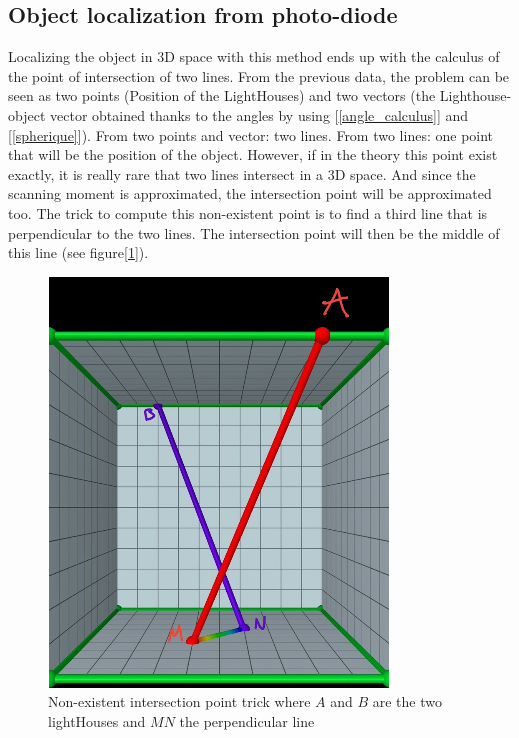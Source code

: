 \documentclass{vldb}
\begin{document}
\subsection{Object localization from photo-diode}
\label{Obj}
Localizing the object in 3D space with this method ends up with the calculus of the point of intersection of two lines. From the previous data, the problem can be seen as two points (Position of the LightHouses) and two vectors (the Lighthouse-object vector obtained thanks to the angles by using [\ref{angle_calculus}] and [\ref{spherique}]). From two points and vector: two lines. From two lines: one point that will be the position of the object. \newline
However, if in the theory this point exist exactly, it is really rare that two lines intersect in a 3D space. And since the scanning moment is approximated, the intersection point will be approximated too. The trick to compute this non-existent point is to find a third line that is perpendicular to the two lines. The intersection point will then be the middle of this line (see figure[\ref{inter}]).
\begin{figure}
\centering
\includegraphics[width=1.0\columnwidth]{Image/interscetion.png}
\caption{Non-existent intersection point trick where $A$ and $B$ are the two lightHouses and $MN$ the perpendicular line}
\label{inter}
\end{figure}
\end{document}
